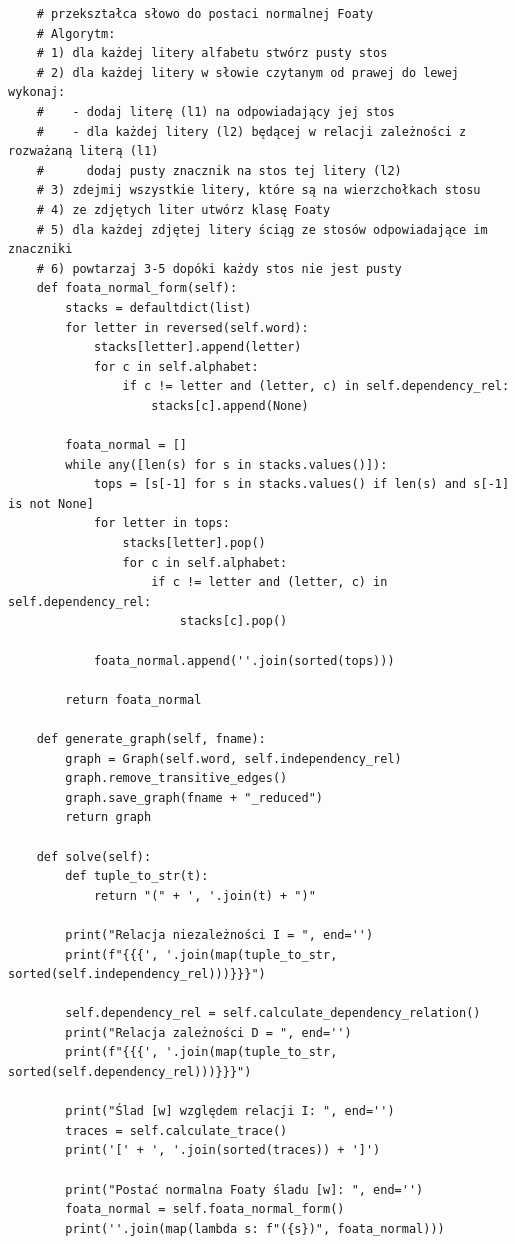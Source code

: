\documentclass[12pt]{article}
\begin{document}
\begin{verbatim}
    # przekształca słowo do postaci normalnej Foaty
    # Algorytm:
    # 1) dla każdej litery alfabetu stwórz pusty stos
    # 2) dla każdej litery w słowie czytanym od prawej do lewej wykonaj:
    #    - dodaj literę (l1) na odpowiadający jej stos
    #    - dla każdej litery (l2) będącej w relacji zależności z rozważaną literą (l1)
    #      dodaj pusty znacznik na stos tej litery (l2)
    # 3) zdejmij wszystkie litery, które są na wierzchołkach stosu
    # 4) ze zdjętych liter utwórz klasę Foaty
    # 5) dla każdej zdjętej litery ściąg ze stosów odpowiadające im znaczniki
    # 6) powtarzaj 3-5 dopóki każdy stos nie jest pusty
    def foata_normal_form(self):
        stacks = defaultdict(list)
        for letter in reversed(self.word):
            stacks[letter].append(letter)
            for c in self.alphabet:
                if c != letter and (letter, c) in self.dependency_rel:
                    stacks[c].append(None)

        foata_normal = []
        while any([len(s) for s in stacks.values()]):
            tops = [s[-1] for s in stacks.values() if len(s) and s[-1] is not None]
            for letter in tops:
                stacks[letter].pop()
                for c in self.alphabet:
                    if c != letter and (letter, c) in self.dependency_rel:
                        stacks[c].pop()

            foata_normal.append(''.join(sorted(tops)))

        return foata_normal

    def generate_graph(self, fname):
        graph = Graph(self.word, self.independency_rel)
        graph.remove_transitive_edges()
        graph.save_graph(fname + "_reduced")
        return graph

    def solve(self):
        def tuple_to_str(t):
            return "(" + ', '.join(t) + ")"

        print("Relacja niezależności I = ", end='')
        print(f"{{{', '.join(map(tuple_to_str, sorted(self.independency_rel)))}}}")

        self.dependency_rel = self.calculate_dependency_relation()
        print("Relacja zależności D = ", end='')
        print(f"{{{', '.join(map(tuple_to_str, sorted(self.dependency_rel)))}}}")

        print("Ślad [w] względem relacji I: ", end='')
        traces = self.calculate_trace()
        print('[' + ', '.join(sorted(traces)) + ']')

        print("Postać normalna Foaty śladu [w]: ", end='')
        foata_normal = self.foata_normal_form()
        print(''.join(map(lambda s: f"({s})", foata_normal)))


\end{verbatim}
\end{document}

